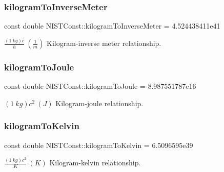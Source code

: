 \subsubsection{\texorpdfstring{kilogram\+To\+Inverse\+Meter}{kilogramToInverseMeter}}
{\footnotesize\ttfamily const double N\+I\+S\+T\+Const\+::kilogram\+To\+Inverse\+Meter = 4.\+524438411e41}

$\frac{(1\ kg)c}{h} \ (\frac{1}{m})$ Kilogram-\/inverse meter relationship. \mbox{\label{group___kilogram_gaf3635d5c9747ebcd2edadf77388fea9b}} 
\subsubsection{\texorpdfstring{kilogram\+To\+Joule}{kilogramToJoule}}
{\footnotesize\ttfamily const double N\+I\+S\+T\+Const\+::kilogram\+To\+Joule = 8.\+987551787e16}

$(1\ kg)c^2 \ (J)$ Kilogram-\/joule relationship. \mbox{\label{group___kilogram_ga79d71b550888761f76eaca5ffc4a29cb}} 
\subsubsection{\texorpdfstring{kilogram\+To\+Kelvin}{kilogramToKelvin}}
{\footnotesize\ttfamily const double N\+I\+S\+T\+Const\+::kilogram\+To\+Kelvin = 6.\+5096595e39}

$\frac{(1\ kg)c^2}{K} \ (K)$ Kilogram-\/kelvin relationship. 